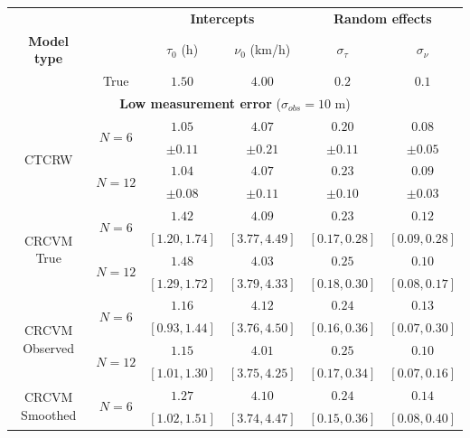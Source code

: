 \documentclass[aoas]{imsart}
\theoremstyle{definition}
\theoremstyle{remark}
\theoremstyle{remark}
\newcommand {\1}{\mathbb{1}}
\begin{document}
	
	\begin{table}[ht!]
		\centering
		\begin{tabular}{|c|c|cccc|}
			\hline
			     & &\multicolumn{2}{|c}{\textbf{Intercepts}}  & \multicolumn{2}{c|}{\textbf{Random effects}} \\
			\cline{3-6}
			     \textbf{Model type} & &$ \tau_0 $ (h) & $\nu_0 $ (km/h)& $\sigma_{\tau}$ & $\sigma_{\nu}$  \\
			\cline{2-6} 
			& True & $1.50$ & $4.00$ & $0.2$ & $0.1$ \\
			\hline
			\multicolumn{6}{|c|}{\textbf{Low measurement error} ($\sigma_{obs} =10$ m)} \\
			\hline
            \multirow{4}{6em}{CTCRW} & \multirow{2}{4em}{$N=6$}  & $1.05$ &
			$4.07$ &
			$0.20$ & $0.08$ 
			\\
			& & $\pm 0.11$ &
			$\pm 0.21$ &
			$\pm 0.11$ & 
			$\pm 0.05$ 
			
			\\
			& \multirow{2}{4em}{$N=12$} & $1.04$ &
			$4.07$ &
			$0.23$ & $0.09$ 
			\\
			& & $\pm 0.08$  &
			$ \pm 0.11$ &
			$ \pm 0.10 $ & $ \pm 0.03$ 
            \\
            \hline
			\multirow{4}{6em}{CRCVM \hspace{0.1cm} True} & \multirow{2}{4em}{$N=6$} & $1.42$ &
			$4.09$ &
			$0.23$ &
			$0.12$
			
			\\
			& &	$[1.20,1.74]$ &
			$ [3.77,4.49] $&
			$[0.17,0.28]$ & $ [0.09,0.28]$ 
			\\
			& \multirow{2}{4em}{$N=12$} & $1.48$ &
			$4.03$ & $0.25$ & $0.10$
			
			\\
			& & $[1.29,1.72]$ &
			$  [3.79,4.33]$ &
			$ [0.18,0.30]$ &
			$ [0.08,0.17]$ 
			\\
            \hline
            \multirow{4}{6em}{CRCVM Observed} & \multirow{2}{4em}{$N=6$} & $1.16$ &
			$4.12$ &
			$0.24$ &
			$0.13$
			
			\\
			& &	$[0.93,1.44]$ &
			$[3.76,4.50]$&
			$[0.16,0.36]$ & $[0.07,0.30]$ 
			\\
			& \multirow{2}{4em}{$N=12$} & $1.15$ &
			$4.01$ & $0.25$ & $0.10$
			
			\\
			& & $ [1.01,1.30]$ &
			$ [3.75,4.25]$ &
			$[0.17,0.34]$ &
			$[0.07,0.16]$ 
			\\
			\hline	
			\multirow{4}{6em}{CRCVM Smoothed} & \multirow{2}{4em}{$N=6$}  & $1.27$ &
			$4.10 $ &
			$0.24$ & $0.14$ 
			\\
			& & $[1.02,1.51]$ &
			$[3.74,4.47]$ &
			$[0.15,0.36]$ & 
			$[0.08,0.40]$ 
			

\end{tabular}
\end{table}
\end{document}
